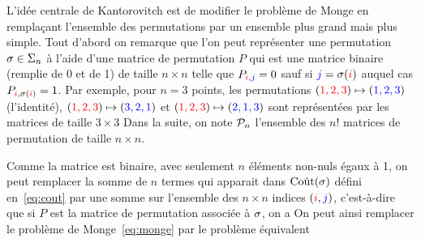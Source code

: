 L'idée centrale de Kantorovitch est de modifier le problème de Monge en remplaçant l'ensemble des permutations par un ensemble plus grand mais plus simple. Tout d'abord on remarque que l'on peut représenter une permutation $\sigma \in \Sigma_n$ à l'aide d'une matrice de permutation $P$ qui est une matrice binaire (remplie de 0 et de 1) de taille $n \times n$ telle que $P_{{\color{red}i},{\color{blue}j}} = 0$ sauf si ${\color{blue}j}=\sigma({\color{red}i})$ auquel cas $P_{{\color{red}i},\sigma({\color{red}i})} = 1$. Par exemple, pour $n=3$ points, les permutations 
$({\color{red}1,2,3}) \mapsto ({\color{blue}1,2,3})$ (l'identité), 
$({\color{red}1,2,3}) \mapsto ({\color{blue}3,2,1})$ et
$({\color{red}1,2,3}) \mapsto ({\color{blue}2,1,3})$ sont représentées par les matrices de taille $3 \times 3$
Dans la suite, on note $\mathcal{P}_n$ l'ensemble des $n!$ matrices de permutation de taille $n \times n$.

Comme la matrice est binaire, avec seulement $n$ éléments non-nuls égaux à 1, on peut remplacer la somme de $n$ termes qui apparait dans $\text{Coût}(\sigma)$ défini en~\eqref{eq:cout} par une somme sur l'ensemble des $n \times n$ indices $({\color{red}i},{\color{blue}j})$, c'est-à-dire que si $P$ est la matrice de permutation associée à $\sigma$, on a 
On peut ainsi remplacer le problème de Monge~\eqref{eq:monge} par le problème équivalent 

